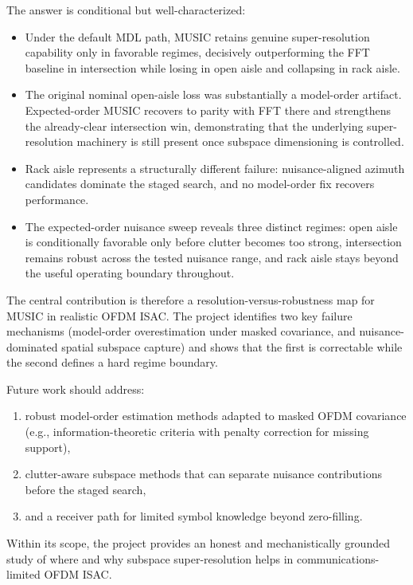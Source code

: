 \documentclass[11pt]{article}
\begin{document}
The answer is conditional but well-characterized:
\begin{itemize}
  \item Under the default MDL path, MUSIC retains genuine super-resolution capability only in favorable regimes, decisively outperforming the FFT baseline in intersection while losing in open aisle and collapsing in rack aisle.
  \item The original nominal open-aisle loss was substantially a model-order artifact. Expected-order MUSIC recovers to parity with FFT there and strengthens the already-clear intersection win, demonstrating that the underlying super-resolution machinery is still present once subspace dimensioning is controlled.
  \item Rack aisle represents a structurally different failure: nuisance-aligned azimuth candidates dominate the staged search, and no model-order fix recovers performance.
  \item The expected-order nuisance sweep reveals three distinct regimes: open aisle is conditionally favorable only before clutter becomes too strong, intersection remains robust across the tested nuisance range, and rack aisle stays beyond the useful operating boundary throughout.
\end{itemize}

The central contribution is therefore a resolution-versus-robustness map for MUSIC in realistic OFDM ISAC. The project identifies two key failure mechanisms (model-order overestimation under masked covariance, and nuisance-dominated spatial subspace capture) and shows that the first is correctable while the second defines a hard regime boundary.

Future work should address:
\begin{enumerate}
  \item robust model-order estimation methods adapted to masked OFDM covariance (e.g., information-theoretic criteria with penalty correction for missing support),
  \item clutter-aware subspace methods that can separate nuisance contributions before the staged search,
  \item and a receiver path for limited symbol knowledge beyond zero-filling.
\end{enumerate}

Within its scope, the project provides an honest and mechanistically grounded study of where and why subspace super-resolution helps in communications-limited OFDM ISAC.
\end{document}
